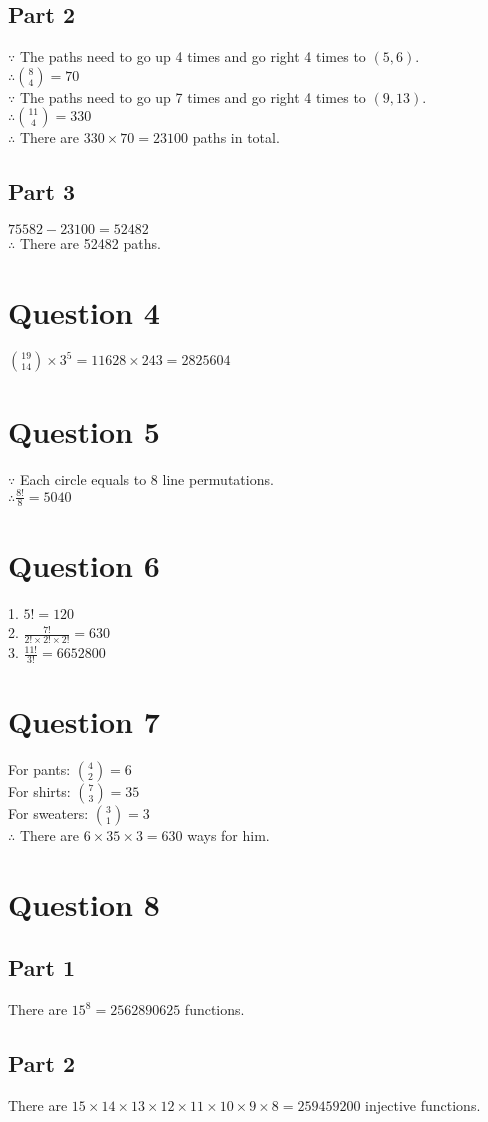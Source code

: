 \documentclass[11pt, oneside]{article}   	%
\begin{document}
	\subsection*{Part 2}
	$\because$ The paths need to go up 4 times and go right 4 times to $(5,6)$.\\
	$\therefore \binom{8}{4} =70$\\
	$\because$ The paths need to go up 7 times and go right 4 times to $(9,13)$.\\
	$\therefore \binom{11}{4} =330$\\
	$\therefore$ There are $330\times 70=23100$ paths in total.

	\subsection*{Part 3}
	$75582-23100=52482$\\
	$\therefore$ There are 52482 paths.

\section*{Question 4}

	$\binom{19}{14}\times 3^{5}=11628 \times 243=2825604$

\section*{Question 5}

	$\because$ Each circle equals to 8 line permutations.\\
	$\therefore \frac{8!}{8}=5040$


\section*{Question 6}

	1. $5!=120$\\
	2. $\frac{7!}{2!\times 2!\times 2!}=630$\\
	3. $\frac{11!}{3!}=6652800$

\section*{Question 7}

	For pants: $\binom{4}{2}=6$\\
	For shirts: $\binom{7}{3}=35$\\
	For sweaters: $\binom{3}{1}=3$\\
	$\therefore$ There are $6\times 35\times 3=630$ ways for him.

\section*{Question 8}

	\subsection*{Part 1}
	There are $15^{8}=2562890625$ functions.

	\subsection*{Part 2}
	There are $15\times 14\times 13\times 12\times 11\times 10\times 9\times 8=259459200$ injective functions.
\end{document}
